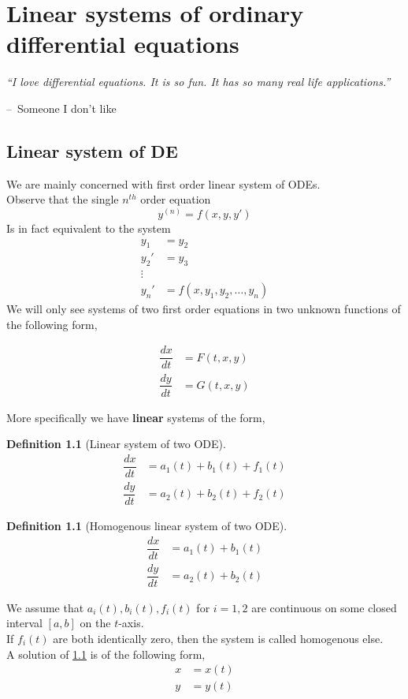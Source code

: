 \documentclass[oneside,11pt,pdftex,final]{book}%
\makeatletter
\numberwithin{equation}{section}
\newenvironment{chapquote}[2][2em]
{\setlength{\@tempdima}{#1}%
	\def\chapquote@author{#2}%
	\parshape 1 \@tempdima \dimexpr\textwidth-2\@tempdima\relax%
	\itshape}
{\par\normalfont\hfill--\ \chapquote@author\hspace*{\@tempdima}\par\bigskip}
\newtheorem{definition}[theorem]{Definition}
\numberwithin{section}{chapter}
\numberwithin{equation}{chapter}
\makeatother
\begin{document}
\chapter{Linear systems of ordinary differential equations}
\begin{chapquote}{Someone I don't like}
	``I love differential equations. It is so fun. It has so many real life applications.''
\end{chapquote}

\section{Linear system of DE}
We are mainly concerned with first order linear system of ODEs.\\

Observe that the single $ n^{th} $ order equation \[ y^{(n)}=f(x,y,y') \]
Is in fact equivalent to the system 
\begin{align*}
	y_1&=y_2\\
	y_2'&=y_3\\
	\vdots &\\
	y_n'&=f(x,y_1,y_2,\dots,y_n)
\end{align*}
We will only see systems of two first order equations in two unknown functions of the following form,

\begin{align*}
	\dfrac{dx}{dt}&=F(t,x,y)\\
	\dfrac{dy}{dt}&=G(t,x,y)
\end{align*}


More specifically we have \textbf{linear} systems of the form,

\begin{definition}[Linear system of two ODE]\label{def:syslinear}
	\begin{align*}
		\dfrac{dx}{dt}&=a_1(t)+b_1(t)+f_1(t)\\
		\dfrac{dy}{dt}&=a_2(t)+b_2(t)+f_2(t)
	\end{align*} 
\end{definition}


\begin{definition}[Homogenous linear system of two ODE]\label{def:homosyslinear}
	\begin{align*}
		\dfrac{dx}{dt}&=a_1(t)+b_1(t)\\
		\dfrac{dy}{dt}&=a_2(t)+b_2(t)
	\end{align*} 
\end{definition}


We assume that $ a_i(t),b_i(t),f_i(t) $ for $ i=1,2 $ are continuous on some closed interval $ [a,b] $ on the $ t$-axis.\\
If $ f_i(t) $ are both identically zero, then the system is called homogenous else.
\\
A solution of \ref{def:syslinear} is of the following form,
\begin{align*}
	x&=x(t)\\
	y&=y(t)
\end{align*}
\end{document}
